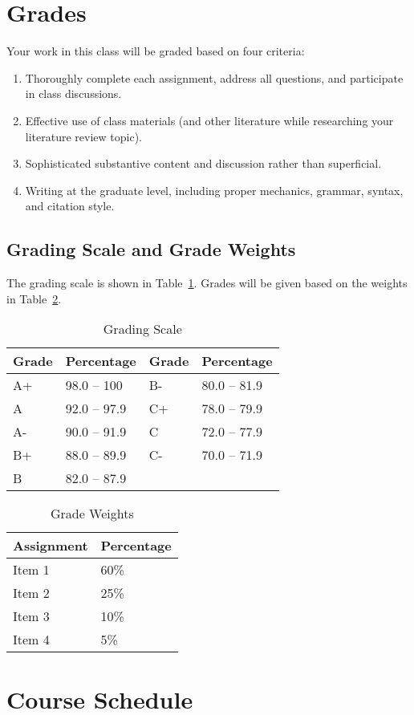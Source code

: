 \documentclass[12pt, letterpaper]{article}
\begin{document}
\section{Grades}

Your work in this class will be graded based on four criteria:
    \begin{enumerate}
        \item Thoroughly complete each assignment, address all questions, and participate in class discussions.
        \item Effective use of class materials (and other literature while researching your literature review topic).
        \item Sophisticated substantive content and discussion rather than superficial.
        \item Writing at the graduate level, including proper mechanics, grammar, syntax, and citation style.
    \end{enumerate}

\subsection*{Grading Scale and Grade Weights}  

The grading scale is shown in Table~\ref{tab:grading-scale}. Grades will be given based on the weights in Table~\ref{tab:grade-weights}.

\begin{table}[h]
\centering
\caption{Grading Scale}
\begin{tabular}{llll}
\toprule
\textbf{Grade} & \textbf{Percentage} & \textbf{Grade} & \textbf{Percentage} \\
\midrule
A+ & 98.0 -- 100 & B- & 80.0 -- 81.9\\
A & 92.0 -- 97.9 & C+ & 78.0 -- 79.9\\
A- & 90.0 -- 91.9 & C & 72.0 -- 77.9\\
B+ & 88.0 -- 89.9 & C- & 70.0 -- 71.9\\
B & 82.0 -- 87.9 & & \\
\bottomrule
\end{tabular}
\label{tab:grading-scale}
\end{table}


\begin{table}[h!]
\centering
\caption{Grade Weights}
\begin{tabular}{ll}
    \toprule
\textbf{Assignment} & \textbf{Percentage} \\
\midrule
Item 1 & 60\% \\
Item 2 & 25\% \\
Item 3 & 10\% \\
Item 4 & 5\% \\
\bottomrule
\end{tabular}
\label{tab:grade-weights}
\end{table}

\section{Course Schedule}
\end{document}
